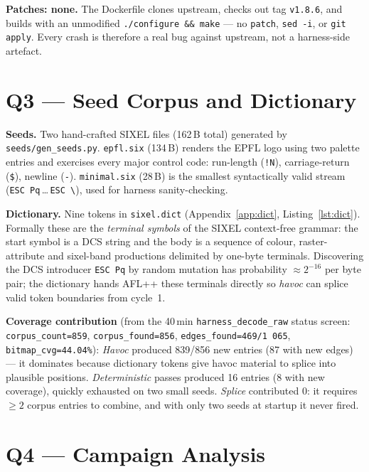 \documentclass[letterpaper,twocolumn,10pt]{article}
\begin{document}
\textbf{Patches: none.} The Dockerfile clones upstream, checks out tag
\texttt{v1.8.6}, and builds with an unmodified \texttt{./configure \&\& make}
--- no \texttt{patch}, \texttt{sed~-i}, or \texttt{git apply}. Every crash is
therefore a real bug against upstream, not a harness-side artefact.

\section{Q3 --- Seed Corpus and Dictionary}

\textbf{Seeds.} Two hand-crafted SIXEL files (162\,B total) generated by
\texttt{seeds/gen\_seeds.py}. \texttt{epfl.six} (134\,B) renders the EPFL logo
using two palette entries and exercises every major control code: run-length
(\texttt{!N}), carriage-return (\texttt{\$}), newline (\texttt{-}).
\texttt{minimal.six} (28\,B) is the smallest syntactically valid stream
(\texttt{ESC Pq}\,\ldots\,\texttt{ESC\,\textbackslash}), used for harness
sanity-checking.

\textbf{Dictionary.} Nine tokens in \texttt{sixel.dict}
(Appendix~\ref{app:dict}, Listing~\ref{lst:dict}). Formally these are the
\emph{terminal symbols} of the SIXEL context-free grammar: the start symbol is
a DCS string and the body is a sequence of colour, raster-attribute and
sixel-band productions delimited by one-byte terminals. Discovering the DCS
introducer \texttt{ESC Pq} by random mutation has probability $\approx 2^{-16}$
per byte pair; the dictionary hands AFL++ these terminals directly so
\emph{havoc} can splice valid token boundaries from cycle~1.

\textbf{Coverage contribution} (from the 40\,min \texttt{harness\_decode\_raw}
status screen: \texttt{corpus\_count=859}, \texttt{corpus\_found=856},
\texttt{edges\_found=469/1\,065}, \texttt{bitmap\_cvg=44.04\%}):
\emph{Havoc} produced 839/856 new entries (87 with new edges) --- it dominates
because dictionary tokens give havoc material to splice into plausible
positions. \emph{Deterministic} passes produced 16 entries (8 with new
coverage), quickly exhausted on two small seeds. \emph{Splice} contributed 0:
it requires $\geq 2$ corpus entries to combine, and with only two seeds at
startup it never fired.

\section{Q4 --- Campaign Analysis}
\end{document}
